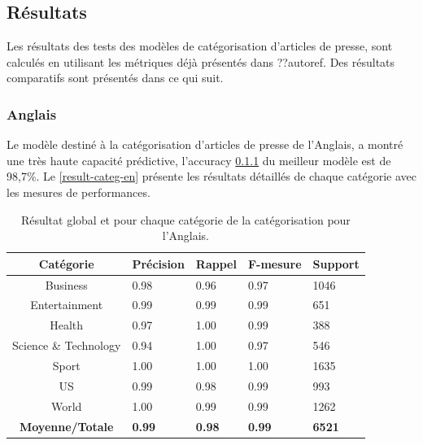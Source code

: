 \subsection{Résultats}
    Les résultats des tests des modèles de catégorisation d'articles de presse, sont calculés en utilisant les métriques déjà présentés dans ??autoref{}. Des résultats comparatifs sont présentés dans ce qui suit.
    \subsubsection{Anglais}
    Le modèle destiné à la catégorisation d'articles de presse de l'Anglais, a montré une très haute capacité prédictive, l'accuracy \ref{} du meilleur modèle est de 98,7\%. Le \autoref{result-categ-en} présente les résultats détaillés de chaque catégorie avec les mesures de performances.
    \begin{table}[H]
        \begin{center}
            \begin{tabular}{|c|C{2cm}|C{2cm}|C{2cm}|C{2cm}|}
                \hline
                \textbf{Catégorie} &  \textbf{Précision} &  \textbf{Rappel} &  \textbf{F-mesure} &  \textbf{Support} \\
                \hline
                Business & 0.98 & 0.96 & 0.97 & 1046 \\
                Entertainment & 0.99 & 0.99 & 0.99 & 651 \\
                Health & 0.97 & 1.00 & 0.99 & 388 \\
                Science \& Technology & 0.94 & 1.00 & 0.97 & 546 \\
                Sport & 1.00 & 1.00 & 1.00 & 1635 \\
                US & 0.99 & 0.98 & 0.99 & 993 \\
                World & 1.00 & 0.99 & 0.99 & 1262 \\                          
                \textbf{Moyenne/Totale} & \textbf{0.99} & \textbf{0.98} & \textbf{0.99} & \textbf{6521} \\
                \hline
            \end{tabular}
        \end{center}
        \caption{Résultat global et pour chaque catégorie de la catégorisation pour l'Anglais.}
        \label{result-categ-en}
    \end{table}

